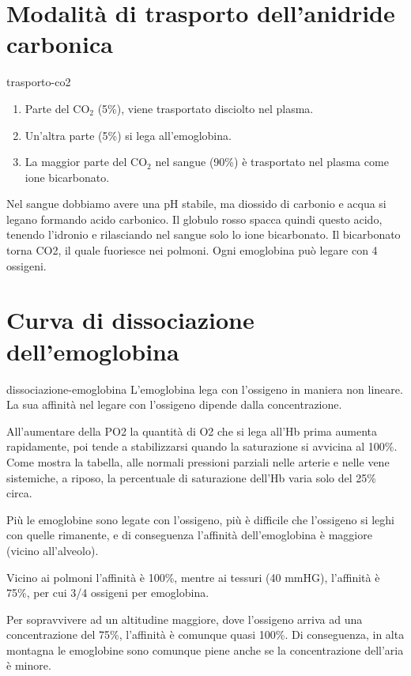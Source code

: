 \documentclass[preview]{standalone}
\begin{document}
\section{Modalità di trasporto dell'anidride carbonica}

\begin{snippet}{trasporto-co2}
    \vspace{-0.5cm}
    \begin{enumerate}
        \item Parte del CO\({}_2\) (5\%), viene trasportato disciolto nel plasma.
        \item Un'altra parte (5\%) si lega all'emoglobina.
        \item La maggior parte del CO\({}_2\) nel sangue (90\%) è trasportato nel plasma come ione bicarbonato. 
    \end{enumerate}
    
    Nel sangue dobbiamo avere una pH stabile, ma diossido di carbonio e acqua
    si legano formando acido carbonico. Il globulo rosso spacca quindi questo acido,
    tenendo l'idronio e rilasciando nel sangue solo lo ione bicarbonato.
    Il bicarbonato torna CO2, il quale fuoriesce nei polmoni.
    Ogni emoglobina può legare con 4 ossigeni.
\end{snippet}

\section{Curva di dissociazione dell'emoglobina}


\begin{snippet}{dissociazione-emoglobina}
    L'emoglobina lega con l'ossigeno in maniera non lineare.
    La sua affinità nel legare con l'ossigeno dipende dalla concentrazione.
    
    All'aumentare della PO2 la quantità di O2 che si lega all'Hb
    prima aumenta rapidamente, poi tende a stabilizzarsi quando la saturazione si avvicina al 100\%.
    Come mostra la tabella, alle normali pressioni parziali nelle
    arterie e nelle vene sistemiche, a riposo, la percentuale di saturazione dell'Hb varia solo del 25\% circa.
    
    Più le emoglobine sono legate con l'ossigeno, più è difficile che l'ossigeno si leghi con quelle rimanente,
    e di conseguenza l'affinità dell'emoglobina è maggiore (vicino all'alveolo).
    
    Vicino ai polmoni l'affinità è 100\%, mentre ai tessuri (40 mmHG), l'affinità è 75\%, per
    cui 3/4 ossigeni per emoglobina.
    
    Per sopravvivere ad un altitudine maggiore, dove l'ossigeno arriva ad una concentrazione del
    75\%, l'affinità è comunque quasi 100\%. Di conseguenza, in alta montagna le emoglobine sono comunque
    piene anche se la concentrazione dell'aria è minore.
\end{snippet}
\end{document}
